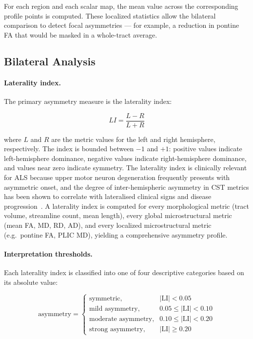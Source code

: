 For each region and each scalar map, the mean value across the corresponding profile points is computed. These localized statistics allow the bilateral comparison to detect focal asymmetries --- for example, a reduction in pontine FA that would be masked in a whole-tract average.

\subsection{Bilateral Analysis}
\label{subsec:methods_bilateral}

\paragraph{Laterality index.}

The primary asymmetry measure is the laterality index:

\begin{equation}
	LI = \frac{L-R}{L+R}
	\label{eq:laterality_index}
\end{equation}

where $L$ and $R$ are the metric values for the left and right hemisphere, respectively. The index is bounded between $-1$ and $+1$: positive values indicate left-hemisphere dominance, negative values indicate right-hemisphere dominance, and values near zero indicate symmetry. The laterality index is clinically relevant for ALS because upper motor neuron degeneration frequently presents with asymmetric onset, and the degree of inter-hemispheric asymmetry in CST metrics has been shown to correlate with lateralised clinical signs and disease progression~\cite{sarica_corticospinal_2017}. A laterality index is computed for every morphological metric (tract volume, streamline count, mean length), every global microstructural metric (mean FA, MD, RD, AD), and every localized microstructural metric (e.g.\ pontine FA, PLIC MD), yielding a comprehensive asymmetry profile.

\paragraph{Interpretation thresholds.}

Each laterality index is classified into one of four descriptive categories based on its absolute value:

\begin{equation}
	\text{asymmetry} =
	\begin{cases}
		\text{symmetric},            & |\mathrm{LI}| < 0.05 \\[2pt]
		\text{mild asymmetry},       & 0.05 \leq |\mathrm{LI}| < 0.10 \\[2pt]
		\text{moderate asymmetry},   & 0.10 \leq |\mathrm{LI}| < 0.20 \\[2pt]
		\text{strong asymmetry},     & |\mathrm{LI}| \geq 0.20
	\end{cases}
	\label{eq:li_thresholds}
\end{equation}

